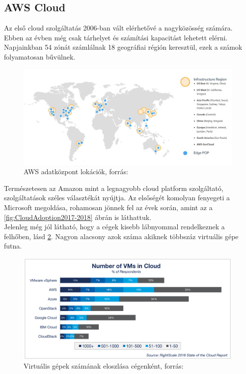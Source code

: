 \documentclass[12pt,oneside,justify,table]{book}
\begin{document}
\subsection{AWS Cloud}
Az első cloud szolgáltatás 2006-ban vált elérhetővé a nagyközösség számára. Ebben az évben még csak tárhelyet és számítási kapacitást lehetett elérni. Napjainkban 54 zónát számlálnak 18 geográfiai régión keresztül, ezek a számok folyamatosan bűvülnek.
\begin{figure}[h]
\centering
\includegraphics[width=1\textwidth]{aws_locations.jpg}
\caption{AWS adatközpont lokációk, forrás: \cite{AWS_Regions}}
\label{fig:AWSRegions}
\end{figure}

Természetesen az Amazon mint a legnagyobb cloud platform szolgáltató, szolgáltatások széles választékát nyújtja. Az elsőségét komolyan fenyegeti a Microsoft megoldása, rohamosan jönnek fel az évek során, amint az a \ref{fig:CloudAdoption2017-2018} ábrán is láthattuk.  \\

Jelenleg még jól látható, hogy a cégek kisebb lábnyommal rendelkeznek a felhőben, lásd \ref{fig:VMsPerCompany}. Nagyon alacsony azok száma akiknek többszáz virtuális gépe futna. 
\begin{figure}[H]
\centering
\includegraphics[width=1\textwidth]{26-Cloud-Computing-Trends-Number-of-VMs.png}
\caption{Virtuális gépek számának eloszlása cégenként, forrás: \cite{RightScale}}
\label{fig:VMsPerCompany}
\end{figure}
\end{document}
